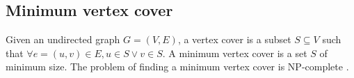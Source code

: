 \subsection{Minimum vertex cover}
Given an undirected graph $G = (V,E)$, a vertex cover is a subset $S \subseteq V$ such that $\forall e = (u,v) \in E,  u \in S \vee v \in S$. A minimum vertex cover is a set $S$ of minimum size. The problem of finding a minimum vertex cover is NP-complete \cite{Kar72}.
